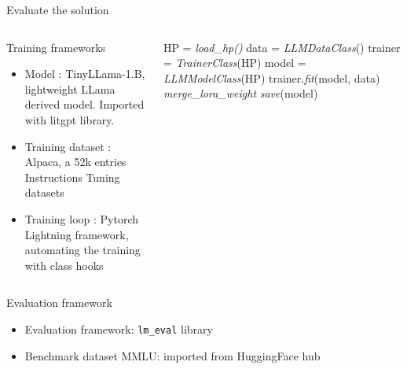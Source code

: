 \begin{frame}[allowframebreaks]{Evaluate the solution}

    
    \begin{columns}
        \begin{column}{0.45\textwidth}
            \begin{block}{Training frameworks}
                \begin{itemize}
                    \item Model : TinyLLama-1.B, lightweight LLama derived model. Imported with litgpt library. 
                    \item Training dataset : Alpaca\cite{alpaca}, a 52k entries Instructions Tuning datasets
                    \item Training loop : Pytorch Lightning framework, automating the training with class hooks
                \end{itemize}
            \end{block}
        \end{column}
        
        \begin{column}{0.55\textwidth}
            \begin{algorithm}[H]
            \begin{algorithmic}[1]
                \STATE HP = \textit{load\_hp()}
                \STATE data = \textit{LLMDataClass}()
                \STATE trainer = \textit{TrainerClass}(HP)
                \STATE model = \textit{LLMModelClass}(HP)
                \STATE trainer.\textit{fit}(model, data)
                \STATE \textit{merge\_lora\_weight}
                \STATE \textit{save}(model)
            \end{algorithmic}
            \caption{Training pseudocode}
            \label{alg:train}
            \end{algorithm}
        \end{column}
    \end{columns}
\framebreak


    \begin{columns}
        \begin{column}{0.35\textwidth}
            \begin{block}{Evaluation framework}
                \begin{itemize}
                    \item Evaluation framework: \texttt{lm\_eval} library
                    \item Benchmark dataset MMLU: imported from HuggingFace hub
                \end{itemize}
            \end{block}
        \end{column}
        

\end{columns}
\end{frame}
